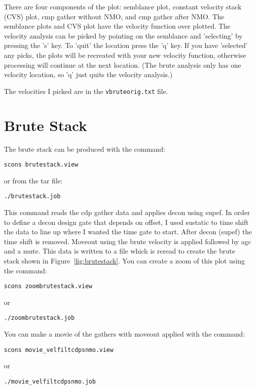 There are four components of the plot: semblance plot, constant velocity 
stack (CVS) plot, cmp gather without NMO, and cmp gather after NMO.  The 
semblance plots and CVS plot have the velocity function over plotted.  
The velocity analysis can be picked by pointing on the semblance and 
'selecting' by pressing the 's' key.  To 'quit' the location press the 
'q' key.  If you have 'selected' any picks, the plots will be recreated 
with your new velocity function, otherwise processing will continue at 
the next location.  (The brute analysis only has one velocity location, 
so 'q' just quits the velocity analysis.)

The velocities I picked are in the \texttt{vbruteorig.txt} file.


\section{Brute Stack}
The brute stack can be produced with the command: 
\begin{verbatim}
scons brutestack.view
\end{verbatim}
or from the tar file:
\begin{verbatim}
./brutestack.job
\end{verbatim}

This command reads the cdp gather data and applies decon using supef.  In 
order to define a decon design gate that depends on offset, I used sustatic 
to time shift the data to line up where I wanted the time gate to start.  
After decon (supef) the time shift is removed.  Moveout using the brute 
velocity is applied followed by agc and a mute.  This data is written to a 
file which is reread to create the brute stack shown in 
Figure~\ref{fig:brutestack}.  You can create a zoom of this plot using the 
command:
\begin{verbatim}
scons zoombrutestack.view
\end{verbatim}
or
\begin{verbatim}
./zoombrutestack.job
\end{verbatim}

You can make a movie of the gathers with moveout applied with the
command: 
\begin{verbatim}
scons movie_velfiltcdpsnmo.view
\end{verbatim}
or
\begin{verbatim}
./movie_velfiltcdpsnmo.job
\end{verbatim}

